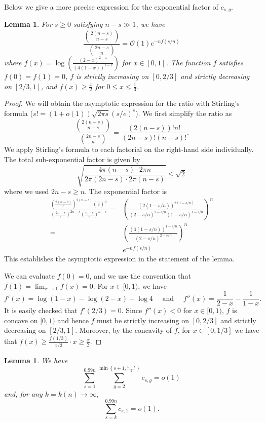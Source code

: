 \documentclass[11pt]{article}
\newtheorem{lemma}[theorem]{Lemma}
\theoremstyle{definition}
\theoremstyle{remark}
\theoremstyle{remark}
\numberwithin{theorem}{section}
\newcommand{\bigO}{\mathcal{O}}
\newcommand{\ds}{\displaystyle}
\begin{document}
Below we give a more precise expression for the exponential factor of $c_{s,g}$.

\begin{lemma}\label{lem:exp_term}
	For $s \geq 0$ satisfying $n-s \gg 1$, we have
	$$
		\frac{\binom{2(n-s)}{n-s}}{\binom{2n-s}{n}} = \bigO(1)e^{-nf(s/n)}
	$$
	where $f(x) =  \log\left(\frac{(2-x)^{2-x}}{(4(1-x))^{1-x}} \right)$ for $x \in [0,1]$. The function $f$ satisfies $f(0) = f(1) = 0$, $f$ is strictly increasing on $[0,2/3]$ and strictly decreasing on $[2/3,1]$, and $f(x) \geq \frac{x}{2}$ for $0 \leq x \leq \frac{1}{3}$. 
\end{lemma}

\begin{proof}
	We will obtain the asymptotic expression for the ratio with Stirling's formula ($s! = (1+o(1)) \sqrt{2\pi s} (s/e)^s$). We first simplify the ratio as
    $$
        \frac{\binom{2(n-s)}{n-s}}{\binom{2n-s}{n}} = \frac{(2(n-s))!n!}{(2n-s)!(n-s)!}.
    $$
    We apply Stirling's formula to each factorial on the right-hand side individually. The total sub-exponential factor is given by 
    $$
        \sqrt{\frac{4\pi(n-s) \cdot 2\pi n}{2\pi(2n-s) \cdot 2\pi(n-s)}} \leq \sqrt{2}
    $$
    where we used $2n-s \geq n$. The exponential factor is
    \begin{align*}
        \frac{\left(\frac{2(n-s)}{e} \right)^{2(n-s)}\left(\frac{n}{e}\right)^{n}}{\left(\frac{2n-s}{e} \right)^{2n-s}\left(\frac{n-s}{e} \right)^{n-s}} =& \left(\frac{(2(1-s/n))^{2(1-s/n)}}{(2-s/n)^{2-s/n}(1-s/n)^{1-s/n}}\right)^{n}\\
        =&\left(\frac{(4(1-s/n))^{1-s/n}}{(2-s/n)^{2-s/n}}\right)^{n}\\
        =&e^{-nf(s/n)}
    \end{align*}
    This establishes the asymptotic expression in the statement of the lemma. 
    
    We can evaluate $f(0) = 0$, and we use the convention that $f(1) = \ds\lim_{x \to 1}f(x) = 0$. For $x \in [0,1)$, we have
	$$
		f'(x) = \log(1-x)-\log(2-x) + \log 4 \quad\text{ and }\quad f''(x) = \frac{1}{2-x} - \frac{1}{1-x}.
	$$
	It is easily checked that $f'(2/3) = 0$. Since $f''(x) < 0$ for $x \in [0,1)$, $f$ is concave on $[0,1)$ and hence $f$ must be strictly increasing on $[0,2/3]$ and strictly decreasing on $[2/3,1]$. Moreover, by the concavity of $f$, for $x \in [0,1/3]$ we have that $f(x) \geq \frac{f(1/3)}{1/3}\cdot x \geq \frac{x}{2}$.
\end{proof}

\begin{lemma}\label{lem:small_j} We have
	$$
		\sum_{s=1}^{0.99n}\sum_{g=2}^{\min\left\{ s+1, \frac{n-s}{2}\right\}}c_{s,g} = o(1)
	$$
	and, for any $k = k(n) \to \infty$, 
	$$
		\sum_{s=k}^{0.99n}c_{s,1} = o(1).
	$$
\end{lemma}
\end{document}
